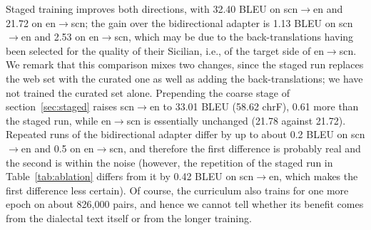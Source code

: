 \documentclass[11pt,a4paper]{article}
\begin{document}




Staged training improves both directions, with 32.40 BLEU on scn$\to$en
and 21.72 on en$\to$scn; the gain over the bidirectional adapter is 1.13 BLEU on scn$\to$en
and 2.53 on en$\to$scn, which may be due to the back-translations having been selected for the quality of their Sicilian, i.e., of the target side of en$\to$scn. We remark that this
comparison mixes two changes, since the staged run replaces the web set with the curated one as
well as adding the back-translations; we have not trained the curated set alone.
Prepending the coarse stage of section~\ref{sec:staged} raises scn$\to$en to 33.01 BLEU (58.62 chrF), 0.61 more than the
staged run, while en$\to$scn is essentially unchanged (21.78 against 21.72). Repeated runs of the
bidirectional adapter differ by up to about 0.2 BLEU on scn$\to$en and 0.5 on en$\to$scn, and
therefore the first difference is probably real and the second is within the noise (however, the repetition of the staged run in Table~\ref{tab:ablation} differs from it by 0.42 BLEU on scn$\to$en, which makes the first difference less certain). Of course,
the curriculum also trains for one more epoch on about 826{,}000 pairs, and hence we cannot tell
whether its benefit comes from the dialectal text itself or from the longer training.


\end{document}
